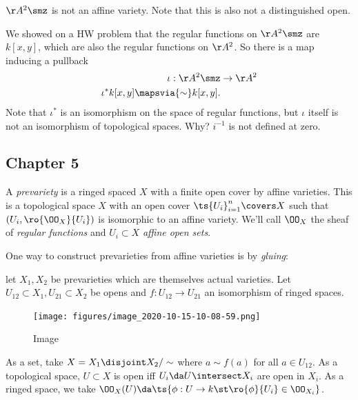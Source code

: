 \begin{example}

\(\AA^2 \smz\) is not an affine variety. Note that this is also not a
distinguished open.

We showed on a HW problem that the regular functions on \(\AA^2\smz\)
are \(k[x, y]\), which are also the regular functions on \(\AA^2\). So
there is a map inducing a pullback
\begin{align*}  
\iota: \AA^2\smz &\to \AA^2 \\
\iota^* k[x, y] \mapsvia{\sim} k[x, y]
.\end{align*} Note that \(\iota^*\) is an isomorphism on the space of
regular functions, but \(\iota\) itself is not an isomorphism of
topological spaces. Why? \(i^{-1}\) is not defined at zero.

\end{example}

\hypertarget{chapter-5}{%
\subsection{Chapter 5}\label{chapter-5}}

\begin{definition}[Prevariety]

A \emph{prevariety} is a ringed spaced \(X\) with a finite open cover by
affine varieties. This is a topological space \(X\) with an open cover
\(\ts{U_i}_{i=1}^n \covers X\) such that \((U_i, \ro{\OO_X}{U_i} )\) is
isomorphic to an affine variety. We'll call \(\OO_X\) the sheaf of
\emph{regular functions} and \(U_i\subset X\) \emph{affine open sets}.

\end{definition}

One way to construct prevarieties from affine varieties is by
\emph{gluing}:

\begin{definition}

let \(X_1, X_2\) be prevarieties which are themselves actual varieties.
Let \(U_{12} \subset X_1, U_{21} \subset X_2\) be opens and
\(f: U_{12} \to U_{21}\) an isomorphism of ringed spaces.

\begin{figure}
\centering
\texttt{[image: figures/image\_2020-10-15-10-08-59.png]}
\caption{Image}
\end{figure}

As a set, take \(X = X_1 \disjoint X_2/\sim\) where \(a\sim f(a)\) for
all \(a\in U_{12}\). As a topological space, \(U \subset X\) is open iff
\(U_i \da U\intersect X_i\) are open in \(X_i\). As a ringed space, we
take
\(\OO_X(U) \da \ts{\phi: U\to k \st \ro{\phi}{U_i} \in \OO_{X_i}}\).

\end{definition}

